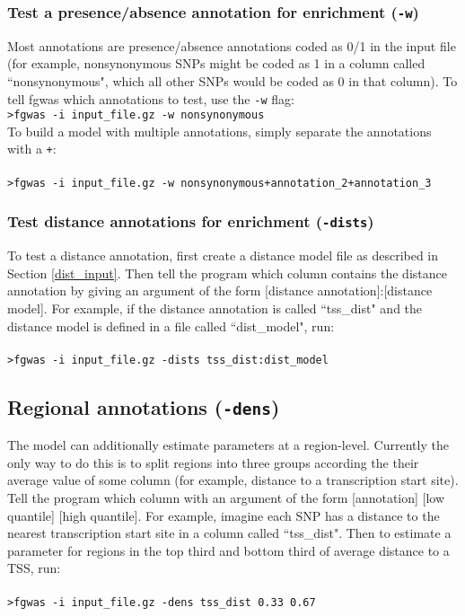 \documentclass[11pt,titlepage]{article}
\begin{document}
\subsubsection{Test a presence/absence annotation for enrichment (\texttt{-w})}
Most annotations are presence/absence annotations coded as 0/1 in the input file (for example, nonsynonymous SNPs might be coded as 1 in a column called ``nonsynonymous", which all other SNPs would be coded as 0 in that column). To tell fgwas which annotations to test, use the \texttt{-w} flag:\\

\noindent \texttt{>fgwas -i input\_file.gz -w nonsynonymous}\\

\noindent To build a model with multiple annotations, simply separate the annotations with a \texttt{+}:
\\
\\
\noindent \texttt{>fgwas -i input\_file.gz -w nonsynonymous+annotation\_2+annotation\_3}

\subsubsection{Test distance annotations for enrichment (\texttt{-dists})}
To test a distance annotation, first create a distance model file as described in Section \ref{dist_input}. Then tell the program which column contains the distance annotation by giving an argument of the form [distance annotation]:[distance model]. For example, if the distance annotation is called ``tss\_dist" and the distance model is defined in a file called ``dist\_model", run:\\
\\
\noindent \texttt{>fgwas -i input\_file.gz -dists tss\_dist:dist\_model}\\

\subsection{Regional annotations (\texttt{-dens})}
The model can additionally estimate parameters at a region-level. Currently the only way to do this is to split regions into three groups according the their average value of some column (for example, distance to a transcription start site). Tell the program which column with an argument of the form [annotation] [low quantile] [high quantile]. For example, imagine each SNP has a distance to the nearest transcription start site in a column called ``tss\_dist". Then to estimate a parameter for regions in the top third and bottom third of average distance to a TSS, run:
\\
\\
\noindent \texttt{>fgwas -i input\_file.gz -dens tss\_dist 0.33 0.67}
\end{document}
